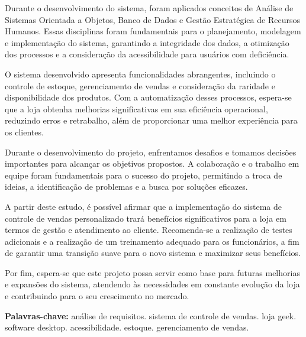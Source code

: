 \documentclass[
	12pt,				%
	openright,			%
	twoside,			%
	a4paper,			%
	english,			%
	brazil				%
	]{abntex2}
\begin{document}
Durante o desenvolvimento do sistema, foram aplicados conceitos de Análise de Sistemas Orientada a Objetos, Banco de Dados e Gestão Estratégica de Recursos Humanos. Essas disciplinas foram fundamentais para o planejamento, modelagem e implementação do sistema, garantindo a integridade dos dados, a otimização dos processos e a consideração da acessibilidade para usuários com deficiência.

O sistema desenvolvido apresenta funcionalidades abrangentes, incluindo o controle de estoque, gerenciamento de vendas e consideração da raridade e disponibilidade dos produtos. Com a automatização desses processos, espera-se que a loja obtenha melhorias significativas em sua eficiência operacional, reduzindo erros e retrabalho, além de proporcionar uma melhor experiência para os clientes.

Durante o desenvolvimento do projeto, enfrentamos desafios e tomamos decisões importantes para alcançar os objetivos propostos. A colaboração e o trabalho em equipe foram fundamentais para o sucesso do projeto, permitindo a troca de ideias, a identificação de problemas e a busca por soluções eficazes.

A partir deste estudo, é possível afirmar que a implementação do sistema de controle de vendas personalizado trará benefícios significativos para a loja em termos de gestão e atendimento ao cliente. Recomenda-se a realização de testes adicionais e a realização de um treinamento adequado para os funcionários, a fim de garantir uma transição suave para o novo sistema e maximizar seus benefícios.

Por fim, espera-se que este projeto possa servir como base para futuras melhorias e expansões do sistema, atendendo às necessidades em constante evolução da loja e contribuindo para o seu crescimento no mercado.

\vspace{\baselineskip}

\noindent
\textbf{Palavras-chave:} análise de requisitos. sistema de controle de vendas. loja geek. software desktop. acessibilidade. estoque. gerenciamento de vendas.

\postextual

\clearpage


\end{document}
